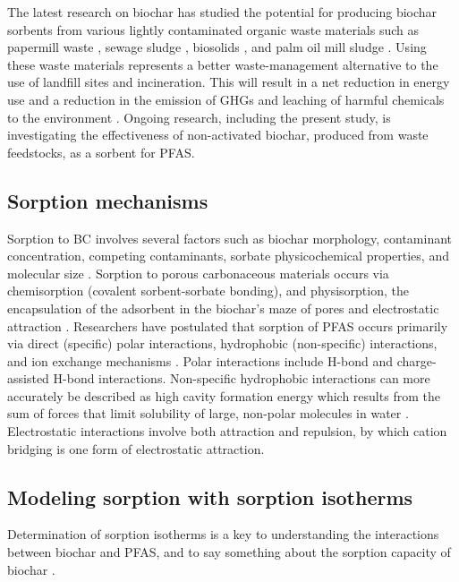 The latest research on biochar has studied the potential for producing biochar sorbents from various lightly contaminated organic waste materials such as papermill waste \citep{van2010effects}, sewage sludge \citep{fathianpour2018lead}, biosolids \citep{wang2011}, and palm oil mill sludge \citep{lam2017adsorption}. Using these waste materials represents a better waste-management alternative to the use of landfill sites and incineration. This will result in a net reduction in energy use and a reduction in the emission of GHGs and leaching of harmful chemicals to the environment \citep{Alhashimi2017}. Ongoing research, including the present study, is investigating the effectiveness of non-activated biochar, produced from waste feedstocks, as a sorbent for PFAS. 

\subsection{Sorption mechanisms}\label{sec:mechanisms}
Sorption to \acrshort{BC} involves several factors such as biochar morphology, contaminant concentration, competing contaminants, sorbate physicochemical properties, and molecular size \citep{Li2019,du2014adsorption}. Sorption to porous carbonaceous materials occurs via chemisorption (covalent sorbent-sorbate bonding), and physisorption, the encapsulation of the adsorbent in the biochar's maze of pores and electrostatic attraction \citep{Li2019}. Researchers have postulated that sorption of PFAS occurs primarily via direct (specific) polar interactions, hydrophobic (non-specific) interactions, and ion exchange mechanisms \citep{Hale2017fire,yu2009sorption}. Polar interactions include H-bond and charge-assisted H-bond interactions. Non-specific hydrophobic interactions can more accurately be described as high cavity formation energy which results from the sum of forces that limit solubility of large, non-polar molecules in water \citep{Arp2006,sigmund2022sorption}. Electrostatic interactions involve both attraction and repulsion, by which cation bridging is one form of electrostatic attraction.

\subsection{Modeling sorption with sorption isotherms}
Determination of sorption isotherms is a key to understanding the interactions between biochar and PFAS, and to say something about the sorption capacity of biochar \citep{yu2009sorption,Li2019}.

